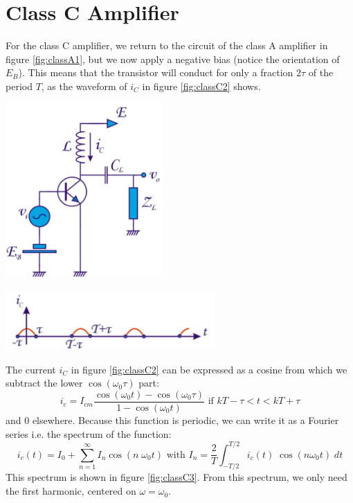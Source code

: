 \section{Class C Amplifier}
\label{sec:classC}
For the class C amplifier, we return to the circuit of the class A amplifier in figure \ref{fig:classA1}, but we now apply a negative bias (notice the orientation of $E_B$). This means that the transistor will conduct for only a fraction $2 \tau$ of the period $T$, as the waveform of $i_C$ in figure \ref{fig:classC2} shows.
\begin{minipage}{.5\textwidth}
	\centering
	\includegraphics[width=6cm]{figures/ch09/classC1.jpg}
	\label{fig:classC1}
\end{minipage}%
\begin{minipage}{.5\textwidth}
	\centering
	\includegraphics[width=8cm]{figures/ch09/classC2.jpg}
	\label{fig:classC2}
\end{minipage}
The current $i_C$ in figure \ref{fig:classC2} can be expressed as a cosine from which we subtract the lower $\cos(\omega_0 \tau)$ part:
$$
i_c = I_{cm} \frac{\cos(\omega_0 t) - \cos(\omega_0 \tau) }{1 - \cos(\omega_0 t)} \text{ if } kT - \tau < t < kT + \tau
$$
and $0$ elsewhere. Because this function is periodic, we can write it as a Fourier series i.e. the spectrum of the function:
$$
i_c(t) = I_0 + \sum_{n=1}^{\infty} I_n \cos(n\; \omega_0 t) \text{ with } I_n = \frac{2}{T} \int_{-T/2}^{T/2} i_c(t) \; \cos(n \omega_0 t) \; dt
$$
This spectrum is shown in figure \ref{fig:classC3}. From this spectrum, we only need the first harmonic, centered on $\omega = \omega_0$.\\

